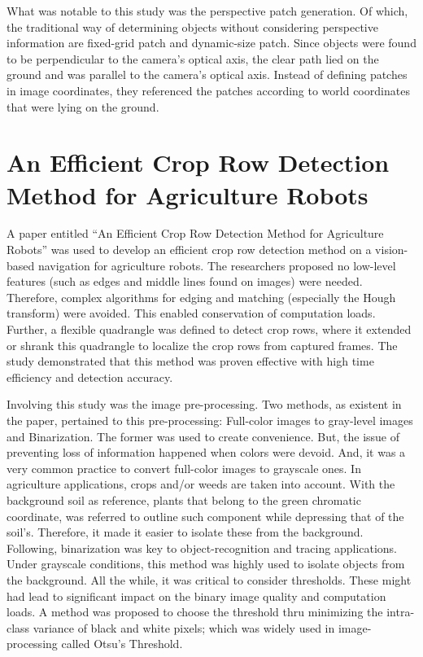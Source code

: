     What was notable to this study was the perspective patch generation. Of which, the traditional way of determining objects without considering perspective information are fixed-grid patch and dynamic-size patch. Since objects were found to be perpendicular to the camera’s optical axis, the clear path lied on the ground and was parallel to the camera’s optical axis. Instead of defining patches in image coordinates, they referenced the patches according to world coordinates that were lying on the ground.

\section{An Efficient Crop Row Detection Method for Agriculture Robots}
   
    A paper entitled “An Efficient Crop Row Detection Method for Agriculture Robots” was used to develop an efficient crop row detection method on a vision-based navigation for agriculture robots. The researchers proposed no low-level features (such as edges and middle lines found on images) were needed. Therefore, complex algorithms for edging and matching (especially the Hough transform) were avoided. This enabled conservation of computation loads. Further, a flexible quadrangle was defined to detect crop rows, where it extended or shrank this quadrangle to localize the crop rows from captured frames. The study demonstrated that this method was proven effective with high time efficiency and detection accuracy.
 
    Involving this study was the image pre-processing. Two methods, as existent in the paper, pertained to this pre-processing: Full-color images to gray-level images and Binarization. The former was used to create convenience. But, the issue of preventing loss of information happened when colors were devoid. And, it was a very common practice to convert full-color images to grayscale ones. In agriculture applications, crops and/or weeds are taken into account. With the background soil as reference, plants that belong to the green chromatic coordinate, was referred to outline such component while depressing that of the soil’s. Therefore, it made it easier to isolate these from the background. Following, binarization was key to object-recognition and tracing applications. Under grayscale conditions, this method was highly used to isolate objects from the background. All the while, it was critical to consider thresholds. These might had lead to significant impact on the binary image quality and computation loads. A method was proposed to choose the threshold thru minimizing the intra-class variance of black and white pixels; which was widely used in image-processing called Otsu’s Threshold.
 
